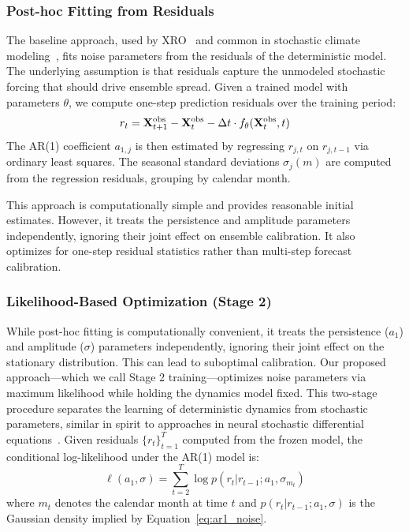 \subsubsection{Post-hoc Fitting from Residuals}

The baseline approach, used by XRO~\cite{zhao2024xro} and common in stochastic climate modeling~\cite{penland1996enso}, fits noise parameters from the residuals of the deterministic model. The underlying assumption is that residuals capture the unmodeled stochastic forcing that should drive ensemble spread. Given a trained model with parameters $\theta$, we compute one-step prediction residuals over the training period:
\begin{equation}
    r_t = \mathbf{X}_{t+1}^{\text{obs}} - \mathbf{X}_t^{\text{obs}} - \Delta t \cdot f_\theta(\mathbf{X}_t^{\text{obs}}, t)
\end{equation}
The AR(1) coefficient $a_{1,j}$ is then estimated by regressing $r_{j,t}$ on $r_{j,t-1}$ via ordinary least squares. The seasonal standard deviations $\sigma_j(m)$ are computed from the regression residuals, grouping by calendar month.

This approach is computationally simple and provides reasonable initial estimates. However, it treats the persistence and amplitude parameters independently, ignoring their joint effect on ensemble calibration. It also optimizes for one-step residual statistics rather than multi-step forecast calibration.

\subsubsection{Likelihood-Based Optimization (Stage 2)}

While post-hoc fitting is computationally convenient, it treats the persistence ($a_1$) and amplitude ($\sigma$) parameters independently, ignoring their joint effect on the stationary distribution. This can lead to suboptimal calibration. Our proposed approach---which we call Stage 2 training---optimizes noise parameters via maximum likelihood while holding the dynamics model fixed. This two-stage procedure separates the learning of deterministic dynamics from stochastic parameters, similar in spirit to approaches in neural stochastic differential equations~\cite{li2020scalable,kidger2021neural}. Given residuals $\{r_t\}_{t=1}^{T}$ computed from the frozen model, the conditional log-likelihood under the AR(1) model is:
\begin{equation}
    \ell(a_1, \sigma) = \sum_{t=2}^{T} \log p(r_t | r_{t-1}; a_1, \sigma_{m_t})
\end{equation}
where $m_t$ denotes the calendar month at time $t$ and $p(r_t | r_{t-1}; a_1, \sigma)$ is the Gaussian density implied by Equation~\ref{eq:ar1_noise}.

